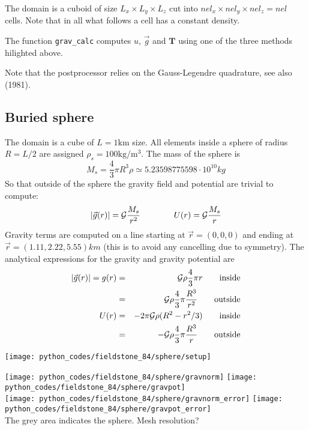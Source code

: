 The domain is a cuboid of size $L_x\times L_y \times L_z$ cut into $nel_x \times nel_y \times nel_z=nel$ cells.
Note that in all what follows a cell has a constant density. 

The function {\tt grav\_calc} computes $u$, $\vec{g}$ and ${\bm T}$ using one of the 
three methods hilighted above. 

Note that the \aspect postprocessor relies on the Gauss-Legendre quadrature, 
see also \textcite{vohb81} (1981).

\newpage
\subsection*{Buried sphere}

The domain is a cube of $L=1\si{\km}$ size. All elements inside a sphere of radius $R=L/2$ are assigned
$\rho_s=100\si{\kg\per\cubic\metre}$.
The mass of the sphere is 
\[
M_s = \frac{4}{3}\pi R^3 \rho \simeq 5.23598775598 \cdot 10^{10} \si{kg}
\]
So that outside of the sphere the gravity field and potential are trivial to compute:
\[
|\vec{g}(r)|={\cal G}\frac{M_s}{r^2}
\qquad
\qquad
U(r)={\cal G}\frac{M_s}{r}
\]
Gravity terms are computed on a line starting at $\vec{r}=(0,0,0)$ and ending at $\vec{r}=(1.11,2.22,5.55)\si{km}$ (this is to avoid any cancelling due to symmetry).
The analytical expressions for the gravity and gravity potential are 
\begin{eqnarray}
|\vec{g}(r)|=g(r) 
&=& {\cal G} \rho \frac{4}{3}\pi r \qquad \text{inside} \nonumber\\
&=& {\cal G} \rho \frac{4}{3}\pi \frac{R^3}{r^2}  \qquad \text{outside} \nonumber\\
U(r) 
&=& - 2 \pi {\cal G} \rho (R^2-r^2/3) \qquad \text{inside} \nonumber\\
&=& - {\cal G} \rho \frac{4}{3}\pi \frac{R^3}{r}  \qquad \text{outside} \nonumber
\end{eqnarray}

\begin{center}
\texttt{[image: python\_codes/fieldstone\_84/sphere/setup]}
\end{center}


\begin{center}
\texttt{[image: python\_codes/fieldstone\_84/sphere/gravnorm]}
\texttt{[image: python\_codes/fieldstone\_84/sphere/gravpot]}\\
\texttt{[image: python\_codes/fieldstone\_84/sphere/gravnorm\_error]}
\texttt{[image: python\_codes/fieldstone\_84/sphere/gravpot\_error]}\\
{\captionfont  The grey area indicates the sphere. Mesh resolution?}
\end{center}

